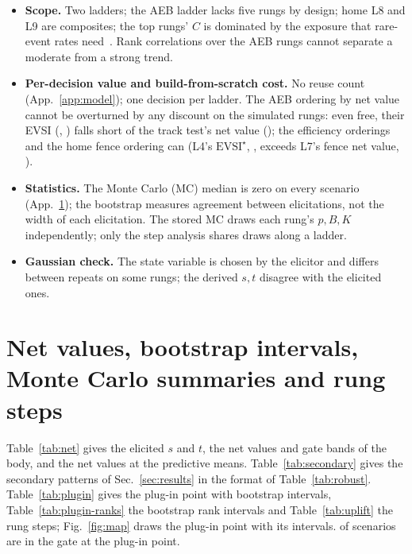 \documentclass{article}
\newcommand{\evsi}{\mathrm{EVSI}}
\begin{document}
\begin{itemize}
\item \textbf{Scope.} Two ladders; the AEB ladder lacks five rungs by design; home L8 and L9 are composites; the top rungs' $C$ is dominated by the exposure that rare-event rates need~\citep{kalra2016driving,zhao2019assessing}. Rank correlations over the \twNAeb{} AEB rungs cannot separate a moderate from a strong trend.
\item \textbf{Per-decision value and build-from-scratch cost.} No reuse count (App.~\ref{app:model}); one decision per ladder. The AEB ordering by net value cannot be overturned by any discount on the simulated rungs: even free, their EVSI (\twAebEVSILFour, \twAebEVSILSix) falls short of the track test's net value (\twAebNetLEight); the efficiency orderings and the home fence ordering can (L4's $\evsi^\star$, \twHomeEVSIStarLFour, exceeds L7's fence net value, \twHomeFenceNetLSeven).
\item \textbf{Statistics.} The Monte Carlo (MC) median is zero on every scenario (App.~\ref{app:summaries}); the bootstrap measures agreement between elicitations, not the width of each elicitation. The stored MC draws each rung's $p,B,K$ independently; only the step analysis shares draws along a ladder.
\item \textbf{Gaussian check.} The state variable is chosen by the elicitor and differs between repeats on some rungs; the derived $s,t$ disagree with the elicited ones.
\end{itemize}

\FloatBarrier
\section{Net values, bootstrap intervals, Monte Carlo summaries and rung steps}
\label{app:summaries}

Table~\ref{tab:net} gives the elicited $s$ and $t$, the net values and gate bands of the body, and the net values at the predictive means. Table~\ref{tab:secondary} gives the secondary patterns of Sec.~\ref{sec:results} in the format of Table~\ref{tab:robust}. Table~\ref{tab:plugin} gives the plug-in point with bootstrap intervals, Table~\ref{tab:plugin-ranks} the bootstrap rank intervals and Table~\ref{tab:uplift} the rung steps; Fig.~\ref{fig:map} draws the plug-in point with its intervals. \voiPluginInGate{} of \voiNScenarios{} scenarios are in the gate at the plug-in point.
\end{document}
